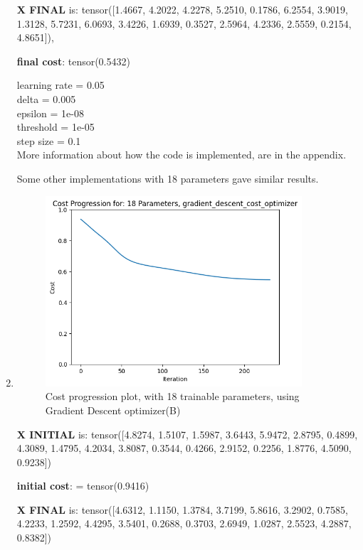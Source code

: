 \documentclass[inscr,ack,preface]{diphdthesis}
\begin{document}
\begin{enumerate}[label=\textbf{\Alph*.}]
\textbf{X FINAL} is:
 tensor([1.4667, 4.2022, 4.2278, 5.2510, 0.1786, 6.2554, 3.9019, 1.3128, 5.7231,
        6.0693, 3.4226, 1.6939, 0.3527, 2.5964, 4.2336, 2.5559, 0.2154, 4.8651]),

\textbf{final cost}: tensor(0.5432)

learning rate =  0.05\\ 
delta =  0.005 \\
epsilon =  1e-08 \\
threshold =  1e-05 \\
step size =  0.1 \\

More information about how the code is implemented, are in the appendix.

Some other implementations with 18 parameters gave similar results.

\item \textbf{ }
\begin{figure}[H]
\begin{center}
    \includegraphics[width=0.9\textwidth]{18.png}
    \caption{Cost progression plot, with 18 trainable parameters, using Gradient Descent optimizer(B)} 
    \label{fig:enter-label}
    \end{center}
\end{figure}

\textbf{X INITIAL} is: tensor([4.8274, 1.5107, 1.5987, 3.6443, 5.9472, 2.8795, 0.4899, 4.3089, 1.4795,
        4.2034, 3.8087, 0.3544, 0.4266, 2.9152, 0.2256, 1.8776, 4.5090, 0.9238])
        
\textbf{initial cost}: = tensor(0.9416)

\textbf{X FINAL} is: tensor([4.6312, 1.1150, 1.3784, 3.7199, 5.8616, 3.2902, 0.7585, 4.2233, 1.2592,
        4.4295, 3.5401, 0.2688, 0.3703, 2.6949, 1.0287, 2.5523, 4.2887, 0.8382])
        

\end{enumerate}
\end{document}
